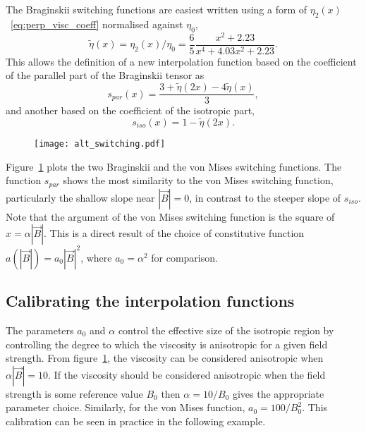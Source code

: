 The Braginskii switching functions are easiest written using a form of $\eta_2(x)$~\eqref{eq:perp_visc_coeff} normalised against $\eta_0$,
\begin{equation}
  \label{eq:eta_function}
  \tilde{\eta}(x) = \eta_2(x)/\eta_0 = \frac{6}{5}\frac{x^2 + 2.23}{x^4 + 4.03x^2 + 2.23}.
\end{equation}
This allows the definition of a new interpolation function based on the coefficient of the parallel part of the Braginskii tensor as
\begin{equation}
  \label{eq:alt_switching1}
s_{par}(x) = \frac{3+\tilde{\eta}(2x)-4\tilde{\eta}(x)}{3},
\end{equation}
and another based on the coefficient of the isotropic part,
\begin{equation}
  \label{eq:alt_switching2}
s_{iso}(x) = 1 - \tilde{\eta}(2x).
\end{equation}

\begin{figure}[t]
  \centering
  \texttt{[image: alt\_switching.pdf]}
  \label{fig:alt_switching}
\end{figure}

Figure~\ref{fig:alt_switching} plots the two Braginskii and the von Mises switching functions. The function $s_{par}$ shows the most similarity to the von Mises switching function, particularly the shallow slope near $|\vec{B}| = 0$, in contrast to the steeper slope of $s_{iso}$. Note that the argument of the von Mises switching function is the square of $x = \alpha |\vec{B}|$. This is a direct result of the choice of constitutive function $a(|\vec{B}|) = a_0 |\vec{B}|^2$, where $a_0 = \alpha^2$ for comparison.

\subsection{Calibrating the interpolation functions}

The parameters $a_0$ and $\alpha$ control the effective size of the isotropic region by controlling the degree to which the viscosity is anisotropic for a given field strength. From figure~\ref{fig:alt_switching}, the viscosity can be considered anisotropic when $\alpha |\vec{B}| = 10$. If the viscosity should be considered anisotropic when the field strength is some reference value $B_0$ then $\alpha = 10/B_0$ gives the appropriate parameter choice. Similarly, for the von Mises function, $a_0 = 100/B_0^2$. This calibration  can be seen in practice in the following example.

